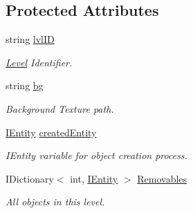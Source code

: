 \subsection*{Protected Attributes}
\begin{DoxyCompactItemize}
\item 
\mbox{\label{class_g_m_t_b_1_1_abstracts_1_1_level_a937018a2b93ea28578b94ba4ec4cedd1}} 
string \mbox{\hyperlink{class_g_m_t_b_1_1_abstracts_1_1_level_a937018a2b93ea28578b94ba4ec4cedd1}{lvl\+ID}}
\begin{DoxyCompactList}\small\item\em \mbox{\hyperlink{class_g_m_t_b_1_1_abstracts_1_1_level}{Level}} Identifier. \end{DoxyCompactList}\item 
\mbox{\label{class_g_m_t_b_1_1_abstracts_1_1_level_a5e9885c94894c66fa434475a98b24a17}} 
string \mbox{\hyperlink{class_g_m_t_b_1_1_abstracts_1_1_level_a5e9885c94894c66fa434475a98b24a17}{bg}}
\begin{DoxyCompactList}\small\item\em Background Texture path. \end{DoxyCompactList}\item 
\mbox{\label{class_g_m_t_b_1_1_abstracts_1_1_level_ad0bf6dbc3a312fd2a2f36a568a8bf764}} 
\mbox{\hyperlink{interface_g_m_t_b_1_1_interfaces_1_1_i_entity}{I\+Entity}} \mbox{\hyperlink{class_g_m_t_b_1_1_abstracts_1_1_level_ad0bf6dbc3a312fd2a2f36a568a8bf764}{created\+Entity}}
\begin{DoxyCompactList}\small\item\em I\+Entity variable for object creation process. \end{DoxyCompactList}\item 
\mbox{\label{class_g_m_t_b_1_1_abstracts_1_1_level_a8ec95ddca3b52d5d168b98ead74cf34a}} 
I\+Dictionary$<$ int, \mbox{\hyperlink{interface_g_m_t_b_1_1_interfaces_1_1_i_entity}{I\+Entity}} $>$ \mbox{\hyperlink{class_g_m_t_b_1_1_abstracts_1_1_level_a8ec95ddca3b52d5d168b98ead74cf34a}{Removables}}
\begin{DoxyCompactList}\small\item\em All objects in this level. \end{DoxyCompactList}\item 

\end{DoxyCompactItemize}
